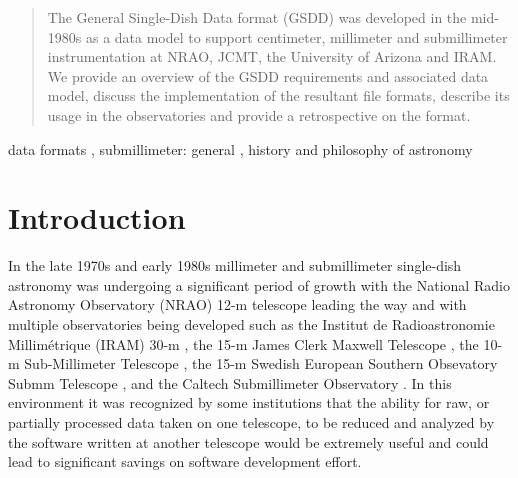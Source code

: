 \documentclass[final,authoryear,5p,times,twocolumn]{elsarticle}
\begin{document}
\begin{frontmatter}
\begin{abstract}

The General Single-Dish Data format (GSDD) was developed in the
mid-1980s as a data model to support centimeter, millimeter and submillimeter
instrumentation at NRAO, JCMT, the University of Arizona and IRAM. We
provide an overview of the GSDD
requirements and associated data model, discuss the implementation
of the resultant file formats, describe its usage in the observatories and
provide a retrospective on the format.

\end{abstract}

\begin{keyword}


data formats \sep
submillimeter: general \sep
history and philosophy of astronomy

\end{keyword}

\end{frontmatter}


\newcommand{\mnras}{MNRAS}
\newcommand{\aap}{A\&A}
\newcommand{\aaps}{A\&AS}
\newcommand{\pasp}{PASP}
\newcommand{\apj}{ApJ}
\newcommand{\apjs}{ApJS}
\newcommand{\qjras}{QJRAS}
\newcommand{\an}{Astron.\ Nach.}
\newcommand{\ijimw}{Int.\ J.\ Infrared \& Millimeter Waves}
\newcommand{\procspie}{Proc.\ SPIE}
\newcommand{\aspconf}{ASP Conf. Ser.}






\section{Introduction}

In the late 1970s and early 1980s millimeter and submillimeter
single-dish astronomy was undergoing a significant period of growth
\citep[see e.g.,][]{2013ASSP...37...39R} with the National Radio
Astronomy Observatory (NRAO) 12-m telescope
leading the way \citep[see e.g.,][]{2005ASSL..323.....G} and with
multiple observatories being developed such as the Institut de
Radioastronomie Millim\'{e}trique (IRAM) 30-m
\citep{1981MitAG..54...61B}, the 15-m James Clerk Maxwell Telescope
\citep[JCMT;][]{1985ESOC...22...63H}, the 10-m Sub-Millimeter
Telescope \citep[SMT;][]{1985ESOC...22...71W}, the 15-m Swedish
European Southern Obsevatory Submm Telescope \citep[SEST;][]{1985ESOC...22...25D}, and the Caltech
Submillimeter Observatory \citep[CSO;][]{1988BAAS...20..690P}. In this
environment it was recognized by some institutions that the ability
for raw, or partially processed data taken on one telescope, to be
reduced and analyzed by the software written at another telescope
would be extremely useful and could lead to significant savings on
software development effort.
\end{document}
